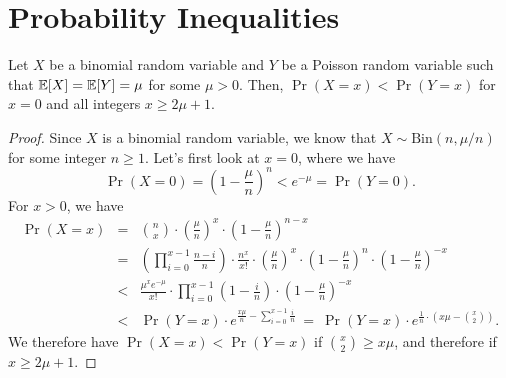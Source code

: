 \appendix

\section{Probability Inequalities}

\begin{lemma}\label{lemma:BinomialPoisson}
  Let $X$ be a binomial random variable and $Y$ be a Poisson random
  variable such that $\operatorname{\mathbb{E}}[X]=\operatorname{\mathbb{E}}[Y]=\mu$ for some $\mu>0$. Then,
  $\Pr(X=x)< \Pr(Y=x)$ for $x=0$ and all integers $x\geq 2\mu+1$.
\end{lemma}
\begin{proof}
  Since $X$ is a binomial random variable, we know that
  $X\sim\mathrm{Bin}(n,\mu/n)$ for some integer $n\geq 1$. Let's first
  look at $x=0$, where we have
  \[
  \Pr(X=0)=\left(1-\frac{\mu}{n}\right)^n < e^{-\mu} = \Pr(Y=0).
  \]
  For $x>0$, we have
  \begin{eqnarray*}
    \Pr(X=x) & = & 
        \binom{n}{x}\cdot \left(\frac{\mu}{n}\right)^x\cdot
        \left(1-\frac{\mu}{n}\right)^{n-x}\\
    & = & \left(\prod_{i=0}^{x-1}\frac{n-i}{n}\right)\cdot \frac{n^x}{x!}\cdot
        \left(\frac{\mu}{n}\right)^x\cdot
        \left(1-\frac{\mu}{n}\right)^{n} \cdot
        \left(1-\frac{\mu}{n}\right)^{-x}\\
    & < & \frac{\mu^x e^{-\mu}}{x!}\cdot
        \prod_{i=0}^{x-1}\left(1-\frac{i}{n}\right)\cdot
        \left(1-\frac{\mu}{n}\right)^{-x}\\
    & < & \Pr(Y=x)\cdot e^{\frac{x\mu}{n}-\sum_{i=0}^{x-1}\frac{i}{n}}\ =\ 
        \Pr(Y=x)\cdot e^{\frac{1}{n}\cdot\left(x\mu - \binom{x}{2}\right)}.
  \end{eqnarray*}
  We therefore have $\Pr(X=x)<\Pr(Y=x)$ if $\binom{x}{2}\geq x\mu$,
  and therefore if $x\geq 2\mu+1$.
\end{proof}

